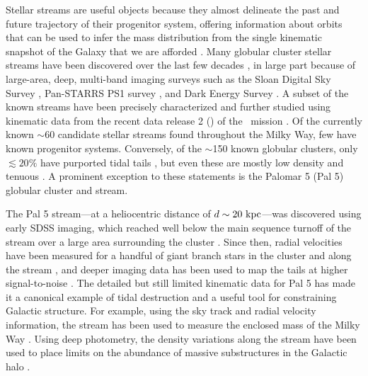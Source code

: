 \documentclass[twocolumn]{aastex63}
\begin{document}
Stellar streams are useful objects because they almost \citep[see][]{Sanders:2013} delineate the past and future trajectory of their progenitor system, offering information about orbits that can be used to infer the mass distribution from the single kinematic snapshot of the Galaxy that we are afforded \citep[e.g.,][]{Johnston:1999, Sanders:2013, PriceWhelan:2014, Bonaca:2018}. %
Many globular cluster stellar streams have been discovered over the last few decades \citep[see, e.g.,][]{Grillmair:2016, Shipp:2018}, in large part because of large-area, deep, multi-band imaging surveys such as the Sloan Digital Sky Survey \citep[SDSS;][]{York:2000}, Pan-STARRS PS1 survey \citep{Chambers:2016}, and Dark Energy Survey \citep{DES:2016}.
A subset of the known streams have been precisely characterized and further studied \citep[e.g.,][]{PriceWhelan:2018, Malhan:2018, Shipp:2019} using kinematic data from the recent data release 2 () of the \Gaia\ mission \citep{Gaia:2016, Gaia:2018}.
Of the currently known $\sim$60 candidate stellar streams found throughout the Milky Way, few have known progenitor systems.
Conversely, of the $\sim$150 known globular clusters, only $\lesssim 20\%$ have purported tidal tails \citep[e.g.,][]{Leon:2000, Kundu:2019}, but even these are mostly low density and tenuous \citep[as might be expected, e.g.,][]{Balbinot:2018}.
A prominent exception to these statements is the Palomar 5 (Pal 5) globular cluster and stream.

The Pal 5 stream---at a heliocentric distance of $d \sim 20~\mathrm{kpc}$---was discovered using early SDSS imaging, which reached well below the main sequence turnoff of the stream over a large area surrounding the cluster \citep{Odenkirchen:2001, Rockosi:2002}.
Since then, radial velocities have been measured for a handful of giant branch stars in the cluster and along the stream \citep{Odenkirchen:2002, Odenkirchen:2009, Ibata:2017}, and deeper imaging data has been used to map the tails at higher signal-to-noise \citep{Bernard:2016, Ibata:2016, Bonaca:2019}.
The detailed but still limited kinematic data for Pal 5 has made it a canonical example of tidal destruction and a useful tool for constraining Galactic structure.
For example, using the sky track and radial velocity information, the stream has been used to measure the enclosed mass of the Milky Way \citep{Kuepper:2015, Bovy:2016}.
Using deep photometry, the density variations along the stream have been used to place limits on the abundance of massive substructures in the Galactic halo \citep{Erkal:2017}.
\end{document}
